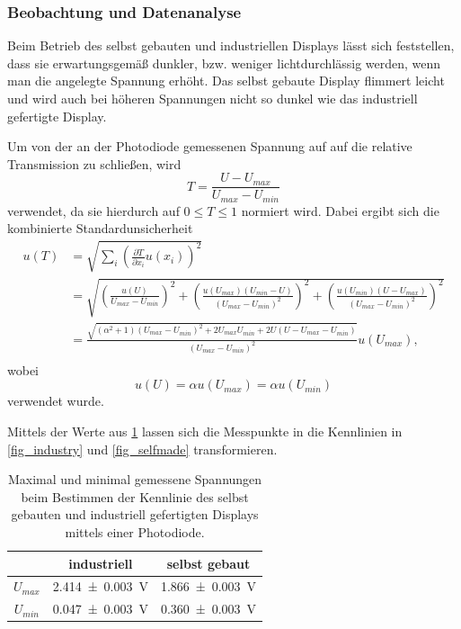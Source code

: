 \documentclass[
	a4paper,
	12pt,
	pagesize,
	ngerman
]{scrartcl}
\begin{document}
	\subsubsection{Beobachtung und Datenanalyse}
	Beim Betrieb des selbst gebauten und industriellen Displays lässt sich feststellen, dass sie erwartungsgemäß dunkler, bzw. weniger lichtdurchlässig werden, wenn man die angelegte Spannung erhöht.
	Das selbst gebaute Display flimmert leicht und wird auch bei höheren Spannungen nicht so dunkel wie das industriell gefertigte Display.

	Um von der an der Photodiode gemessenen Spannung auf auf die relative Transmission zu schließen, wird
	\begin{equation}
			T = \frac{U-U_{max}}{U_{max}-U_{min}}
	\end{equation}
	verwendet, da sie hierdurch auf $0\leq T \leq 1$ normiert wird. Dabei ergibt sich die kombinierte Standardunsicherheit
	\begin{align*}
		u(T) &= \sqrt{\sum_{i}\left(\frac{\partial T}{\partial x_i} u(x_i)\right)^2}\\
		&= \sqrt{\left(\frac{u(U)}{U_{max}-U_{min}}\right)^2+\left(\frac{u(U_{max})(U_{min}-U)}{(U_{max}-U_{min})^2}\right)^2+\left(\frac{u(U_{min})(U-U_{max})}{(U_{max}-U_{min})^2}\right)^2} \\
		&=	\frac{\sqrt{ (\alpha^2+1) (U_{max}-U_{min})^2+2U_{max}U_{min}+2U(U-U_{max}-U_{min})}}{(U_{max}-U_{min})^2} u(U_{max}), \\
	\end{align*}
	wobei
	\begin{equation*}
			u(U)=\alpha u(U_{max})=\alpha u(U_{min})
	\end{equation*}
	verwendet wurde.

	Mittels der Werte aus \cref{tb_maxmin} lassen sich die Messpunkte in die Kennlinien in \cref{fig_industry} und \cref{fig_selfmade} transformieren.
\begin{table}[H]
		\centering
		\begin{tabular}{ c | c | c }
			 & industriell & selbst gebaut \\ \hline
			$U_{max}$ & \SI{2.414+-0.003}{V} & \SI{1.866+-0.003}{V} \\
			$U_{min}$ & \SI{0.047+-0.003}{V} & \SI{0.360+-0.003}{V} \\
		\end{tabular}
		\caption{Maximal und minimal gemessene Spannungen beim Bestimmen der Kennlinie des selbst gebauten und industriell gefertigten Displays mittels einer Photodiode.}
		\label{tb_maxmin}
\end{table}
\end{document}
